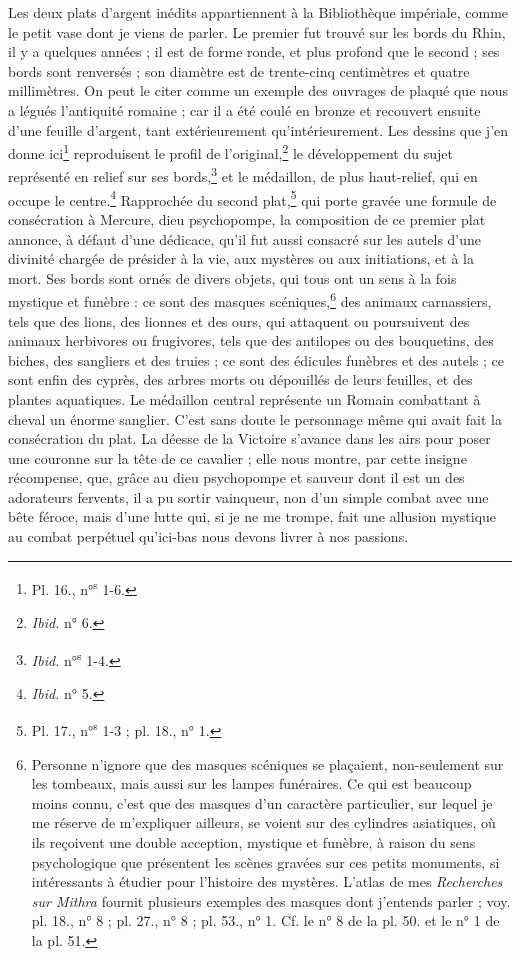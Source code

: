 \documentclass{article}
\begin{document}
Les deux plats d'argent inédits appartiennent à la Bibliothèque impériale, comme le petit vase dont je viens de parler. Le premier fut trouvé sur les bords du Rhin, il y a quelques années ; il est de forme ronde, et plus profond que le second ; ses bords sont renversés ; son diamètre est de trente-cinq centimètres et quatre millimètres. On peut le citer comme un exemple des ouvrages de plaqué que nous a légués l'antiquité romaine ; car il a été coulé en bronze et recouvert ensuite d'une feuille d'argent, tant extérieurement qu'intérieurement. Les dessins que j'en donne ici\footnote{Pl. 16., n°\textsuperscript{s} 1-6.} reproduisent le profil de l'original,\footnote{\emph{Ibid.} n° 6.} le développement du sujet représenté en relief sur ses bords,\footnote{\emph{Ibid.} n°\textsuperscript{s} 1-4.} et le médaillon, de plus haut-relief, qui en occupe le centre.\footnote{\emph{Ibid.} n° 5.} Rapprochée du second plat,\footnote{Pl. 17., n°\textsuperscript{s} 1-3 ; pl. 18., n° 1.} qui porte gravée une formule de consécration à Mercure, dieu psychopompe, la composition de ce premier plat annonce, à défaut d'une dédicace, qu'il fut aussi consacré sur les autels d'une divinité chargée de présider à la vie, aux mystères ou aux initiations, et à la mort. Ses bords sont ornés de divers objets, qui tous ont un sens à la fois mystique et funèbre : ce sont des masques scéniques,\footnote{Personne n'ignore que des masques scéniques se plaçaient, non-seulement sur les tombeaux, mais aussi sur les lampes funéraires. Ce qui est beaucoup moins connu, c'est que des masques d'un caractère particulier, sur lequel je me réserve de m'expliquer ailleurs, se voient sur des cylindres asiatiques, où ils reçoivent une double acception, mystique et funèbre, à raison du sens psychologique que présentent les scènes gravées sur ces petits monuments, si intéressants à étudier pour l'histoire des mystères. L'atlas de mes \emph{Recherches sur Mithra} fournit plusieurs exemples des masques dont j'entends parler ; voy. pl. 18., n° 8 ; pl. 27., n° 8 ; pl. 53., n° 1. Cf. le n° 8 de la pl. 50. et le n° 1 de la pl. 51.} des animaux carnassiers, tels que des lions, des lionnes et des ours, qui attaquent ou poursuivent des animaux herbivores ou frugivores, tels que des antilopes ou des bouquetins, des biches, des sangliers et des truies ; ce sont des édicules funèbres et des autels ; ce sont enfin des cyprès, des arbres morts ou dépouillés de leurs feuilles, et des plantes aquatiques. Le médaillon central représente un Romain combattant à cheval un énorme sanglier. C'est sans doute le personnage même qui avait fait la consécration du plat. La déesse de la Victoire s'avance dans les airs pour poser une couronne sur la tête de ce cavalier ; elle nous montre, par cette insigne récompense, que, grâce au dieu psychopompe et sauveur dont il est un des adorateurs fervents, il a pu sortir vainqueur, non d'un simple combat avec une bête féroce, mais d'une lutte qui, si je ne me trompe, fait une allusion mystique au combat perpétuel qu'ici-bas nous devons livrer à nos passions.
\end{document}
